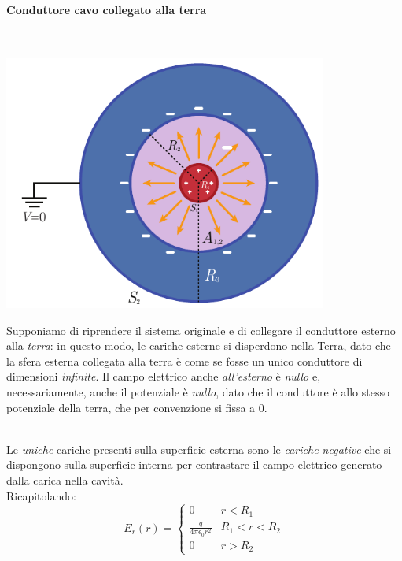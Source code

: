 \paragraph{Conduttore cavo collegato alla terra}~\\
\begin{minipage}{0.43\textwidth}
	\begin{center}
		\includegraphics[width=0.8\textwidth]{images/chp4sferacavaconsferaterra.pdf}
	\end{center}
\end{minipage}\hspace{5pt}
\begin{minipage}{0.56\textwidth}
Supponiamo di riprendere il sistema originale e di collegare il conduttore esterno alla \textit{terra}: in questo modo, le cariche esterne si disperdono nella Terra, dato che la sfera esterna collegata alla terra è come se fosse un unico conduttore di dimensioni \textit{infinite}. Il campo elettrico anche \textit{all'esterno} è \textit{nullo} e, necessariamente, anche il potenziale è \textit{nullo}, dato che il conduttore è allo stesso potenziale della terra, che per convenzione si fissa a 0.
\end{minipage}\\
Le \textit{uniche} cariche presenti sulla superficie esterna sono le \textit{cariche negative} che si dispongono sulla superficie interna per contrastare il campo elettrico generato dalla carica nella cavità.\\
Ricapitolando:
\begin{equation*}
	E_{r}(r)=\begin{cases}
		0 & r<R_1\\
		\frac{q}{4\pi\epsilon_0 r^2} & R_1<r<R_2\\
		0 & r>R_2
	\end{cases}
\end{equation*}

